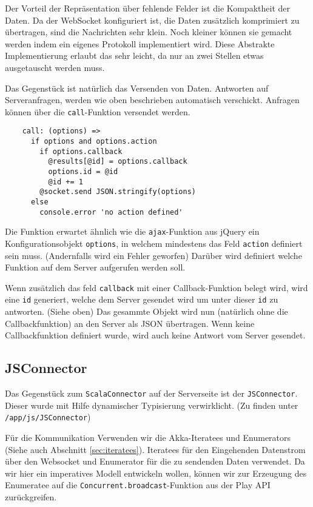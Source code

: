 Der Vorteil der Repräsentation über fehlende Felder ist die Kompaktheit der Daten. Da der WebSocket
konfiguriert ist, die Daten zusätzlich komprimiert zu übertragen, sind die Nachrichten sehr klein.
Noch kleiner können sie gemacht werden indem ein eigenes Protokoll implementiert wird. Diese
Abstrakte Implementierung erlaubt das sehr leicht, da nur an zwei Stellen etwas ausgetauscht werden
muss.

Das Gegenstück ist natürlich das Versenden von Daten. Antworten auf Serveranfragen, werden wie oben
beschrieben automatisch verschickt. Anfragen können über die \texttt{call}-Funktion versendet
werden.

\begin{lstlisting}      
    call: (options) =>      
      if options and options.action        
        if options.callback
          @results[@id] = options.callback
          options.id = @id
          @id += 1
        @socket.send JSON.stringify(options)
      else
        console.error 'no action defined'
\end{lstlisting}

Die Funktion erwartet ähnlich wie die \texttt{ajax}-Funktion aus jQuery ein Konfigurationsobjekt
\texttt{options}, in welchem mindestens das Feld \texttt{action} definiert sein muss. (Andernfalls
wird ein Fehler geworfen) Darüber wird definiert welche Funktion auf dem Server aufgerufen werden
soll.

Wenn zusätzlich das feld \texttt{callback} mit einer Callback-Funktion belegt wird, wird eine
\texttt{id} generiert, welche dem Server gesendet wird um unter dieser \texttt{id} zu antworten.
(Siehe oben) Das gesammte Objekt wird nun (natürlich ohne die Callbackfunktion) an den Server als
JSON übertragen. Wenn keine Callbackfunktion definiert wurde, wird auch keine Antwort vom Server
gesendet.

\subsection{JSConnector}

Das Gegenstück zum \texttt{ScalaConnector} auf der Serverseite ist der \texttt{JSConnector}. Dieser
wurde mit Hilfe dynamischer Typisierung verwirklicht. (Zu finden unter \texttt{/app/js/JSConnector})

Für die Kommunikation Verwenden wir die Akka-Iteratees und Enumerators (Siehe auch Abschnitt
\ref{sec:iteratees}). Iteratees für den Eingehenden Datenstrom über den Websocket und Enumerator für
die zu sendenden Daten verwendet. Da wir hier ein imperatives Modell entwickeln wollen, können wir
zur Erzeugung des Enumeratee auf die \texttt{Concurrent.broadcast}-Funktion aus der Play API
zurückgreifen.

